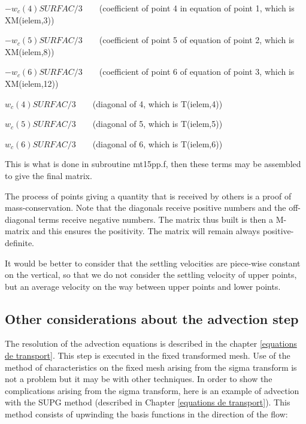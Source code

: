 $-w_{c}(4)SURFAC/3\qquad$(coefficient of point 4 in equation of point 1, which
is XM(ielem,3))

$-w_{c}(5)SURFAC/3\qquad$(coefficient of point 5 of equation of point 2, which
is XM(ielem,8))

$-w_{c}(6)SURFAC/3\qquad$(coefficient of point 6 of equation of point 3, which
is XM(ielem,12))

$w_{c}(4)SURFAC/3\qquad$(diagonal of 4, which is T(ielem,4))

$w_{c}(5)SURFAC/3\qquad$(diagonal of 5, which is T(ielem,5))

$w_{c}(6)SURFAC/3\qquad$(diagonal of 6, which is T(ielem,6))

This is what is done in subroutine mt15pp.f, then these terms may be assembled
to give the final matrix.

The process of points giving a quantity that is received by others is a proof
of mass-conservation. Note that the diagonals receive positive numbers and the
off-diagonal terms receive negative numbers. The matrix thus built is then a
M-matrix and this ensures the positivity. The matrix will remain always positive-definite.

It would be better to consider that the settling velocities are piece-wise
constant on the vertical, so that we do not consider the settling velocity of
upper points, but an average velocity on the way between upper points and
lower points.


\subsection{\label{convection 3D}Other considerations about the advection step}
%

The resolution of the advection equations is described in the chapter
\ref{equations de transport}. This step is executed in the fixed transformed
mesh.
Use of the method of characteristics on the fixed mesh arising from the sigma
transform is not a problem but it may be with other techniques. In order to
show the complications arising from the sigma transform, here is an example of
advection with the SUPG%
method (described in Chapter \ref{equations de transport}). This method
consists of upwinding the basis functions in the direction of the flow:%


